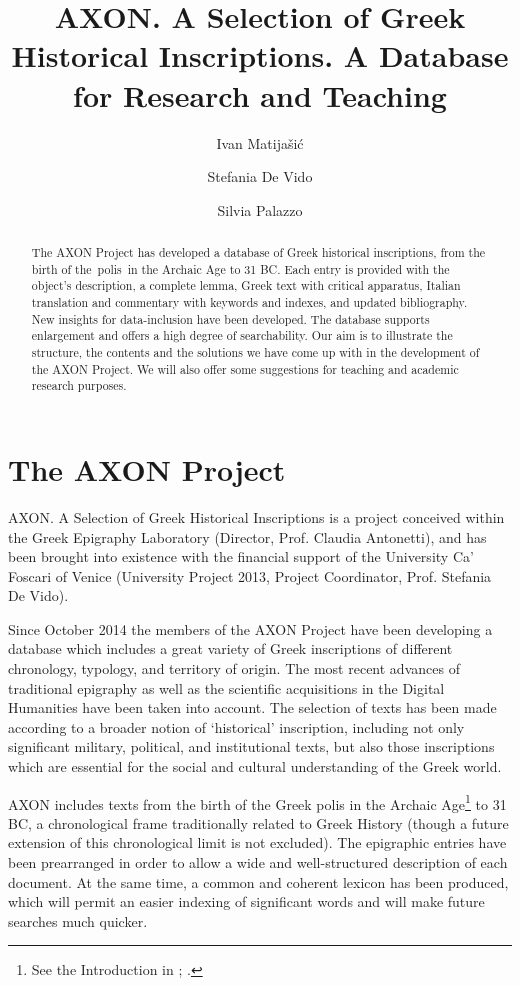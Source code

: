 \documentclass[amsthm,ebook]{saparticle}
\title{AXON. A Selection of Greek Historical Inscriptions. A Database for Research and Teaching}
\author[cafo]{Ivan Matijašić\corref{first}}
\author[cafo]{Stefania De Vido}
\author[cafo]{Silvia Palazzo}
\begin{document}
\maketitle
\begin{abstract}
The AXON Project has developed a database of Greek historical inscriptions, from the birth of the~polis~in the Archaic
Age to 31 BC. Each entry is provided with the object’s description, a complete lemma, Greek text with critical
apparatus, Italian translation and commentary with keywords and indexes, and updated bibliography. New insights for
data-inclusion have been developed. The database supports enlargement and offers a high degree of searchability. Our
aim is to illustrate the structure, the contents and the solutions we have come up with in the development of the AXON
Project. We will also offer some suggestions for teaching and academic research purposes.


\end{abstract}




\section{The AXON Project }


\noindent AXON. A Selection of Greek Historical Inscriptions is a project conceived within the Greek Epigraphy Laboratory
(Director, Prof. Claudia Antonetti), and has been brought into existence with the financial support of the University
Ca’ Foscari of Venice (University Project 2013, Project Coordinator, Prof. Stefania De Vido).

Since October 2014 the members of the AXON Project have been developing a database which includes a great variety of
Greek inscriptions of different chronology, typology, and territory of origin. The most recent advances of traditional
epigraphy as well as the scientific acquisitions in the Digital Humanities have been taken into account. The selection
of texts has been made according to a broader notion of ‘historical’ inscription, including not only significant
military, political, and institutional texts, but also those inscriptions which are essential for the social and
cultural understanding of the Greek world. 

AXON includes texts from the birth of the Greek polis in the Archaic Age\footnote{ See the Introduction in \citet{nielsen_inventory_2004}; \citet{hansen_polis:_2006}. } to 31 BC, a chronological frame traditionally related to Greek History (though a future
extension of this chronological limit is not excluded). The epigraphic entries have been prearranged in order to allow
a wide and well-structured description of each document. At the same time, a common and coherent lexicon has been
produced, which will permit an easier indexing of significant words and will make future searches much quicker. 
\end{document}
